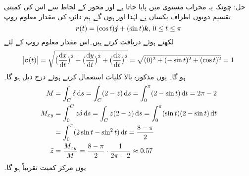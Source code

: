 حل:\quad
چونکہ یہ  محراب مستوی  میں پایا جاتا ہے  اور محور  کے لحاظ سے اس کی کمیتی تقسیم دونوں اطراف یکساں ہے   لہٰذا  اور  ہوں گے۔ہم دائرہ کی مقدار معلوم روپ
\[{{\boldsymbol{r}}}(t)=(\cos t){\boldsymbol{j}}+(\sin t){\boldsymbol{k}},\, 0\le t\le \pi\]
 لکھتے ہوئے  دریافت کرتے ہیں۔اس مقدار معلوم روپ کے لئے
\[\abs{\kvec{v}(t)}=\sqrt{\big(\frac{\dif x}{\dif t}\big)^2+\big(\frac{\dif y}{\dif t}\big)^2+\big(\frac{\dif z}{\dif t}\big)^2}=\sqrt{(0)^2+(-\sin t)^2+(\cos t)^2}=1\]
ہو گا۔ یوں مذکورہ بالا کلیات استعمال کرتے ہوئے درج ذیل ہو گا۔
\begin{align*}
M&=\int_C \delta \dif s=\int_C (2-z)\dif s=\int_0^{\pi}(2-\sin t)\dif t=2\pi-2\\
M_{xy}&=\int_0^C z\delta \dif s=\int_C z(2-z)\dif s=\int_0^{\pi} (\sin t)(2-\sin t)\dif t\\
&=\int_0^{\pi} (2\sin t-\sin^2 t)\dif t=\frac{8-\pi}{2}\\
\bar{z}&=\frac{M_{xy}}{M}=\frac{8-\pi}{2}\cdot\frac{1}{2\pi-2}\approx 0.57
\end{align*}
یوں مرکز کمیت تقریباً  ہو گا۔

